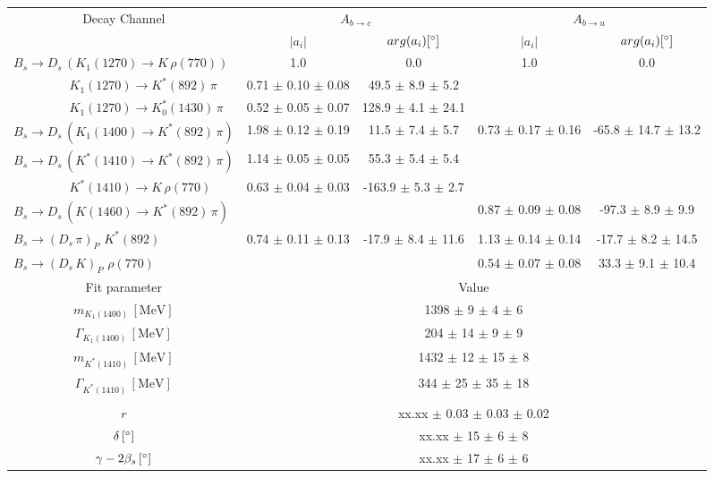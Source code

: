 \begin{tabular}{l c c c c } 
\hline
\hline
\multicolumn{1}{c}{Decay Channel} & \multicolumn{2}{c}{$A_{b \to c}$} & \multicolumn{2}{c}{$A_{b \to u}$}  \\ 
 & \multicolumn{1}{c}{$\vert a_i \vert$}  & \multicolumn{1}{c}{$arg(a_i) [^{\circ}]$}  & \multicolumn{1}{c}{$\vert a_i \vert$} & \multicolumn{1}{c}{$arg(a_i) [^{\circ}]$} \\ 
\hline
 $B_s \to D_s \, ( K_1(1270) \to K \, \rho(770) ) $ &  1.0 & 0.0 & 1.0 & 0.0  \\ 
$\phantom{B_s \to D_s \, (} K_1(1270) \to K^{*}(892) \, \pi \phantom{)} $ & 0.71 $\pm$ 0.10 $\pm$ 0.08 & 49.5 $\pm$ 8.9 $\pm$ 5.2 & &   \\ 
$\phantom{B_s \to D_s \, (} K_1(1270) \to K^{*}_{0}(1430) \, \pi \phantom{)} $ & 0.52 $\pm$ 0.05 $\pm$ 0.07 & 128.9 $\pm$ 4.1 $\pm$ 24.1 & &   \\ 
$B_s \to D_s \, ( K_1(1400) \to K^{*}(892) \, \pi ) $ & 1.98 $\pm$ 0.12 $\pm$ 0.19 & 11.5 $\pm$ 7.4 $\pm$ 5.7 & 0.73 $\pm$ 0.17 $\pm$ 0.16 & -65.8 $\pm$ 14.7 $\pm$ 13.2 \\ 
$B_s \to D_s \, ( K^{*}(1410) \to K^{*}(892) \, \pi ) $ & 1.14 $\pm$ 0.05 $\pm$ 0.05 & 55.3 $\pm$ 5.4 $\pm$ 5.4 &  &  \\ 
$\phantom{B_s \to D_s \, (} K^{*}(1410) \to K \, \rho(770) \phantom{)} $ & 0.63 $\pm$ 0.04 $\pm$ 0.03 & -163.9 $\pm$ 5.3 $\pm$ 2.7 & &   \\ 
$B_s \to D_s \, ( K(1460) \to K^{*}(892) \, \pi ) $ & & &0.87 $\pm$ 0.09 $\pm$ 0.08 & -97.3 $\pm$ 8.9 $\pm$ 9.9 \\ 
$B_s \to ( D_s \, \pi)_{P} \, \, K^{*}(892) $ & 0.74 $\pm$ 0.11 $\pm$ 0.13 & -17.9 $\pm$ 8.4 $\pm$ 11.6 & 1.13 $\pm$ 0.14 $\pm$ 0.14 & -17.7 $\pm$ 8.2 $\pm$ 14.5 \\ 
$B_s \to ( D_s \, K)_{P} \, \, \rho(770) $ & & &0.54 $\pm$ 0.07 $\pm$ 0.08 & 33.3 $\pm$ 9.1 $\pm$ 10.4 \\ 
\hline
\hline
\multicolumn{1}{c}{Fit parameter} & \multicolumn{4}{c}{Value}  \\ 
\hline
\multicolumn{1}{c}{$m_{K_1(1400)} \, [\text{MeV}]$} & \multicolumn{4}{c}{1398 $\pm$ 9 $\pm$ 4 $\pm$ 6} \\ 
\multicolumn{1}{c}{$\Gamma_{K_1(1400)} \, [\text{MeV}]$} & \multicolumn{4}{c}{204 $\pm$ 14 $\pm$ 9 $\pm$ 9} \\ 
\multicolumn{1}{c}{$m_{K^{*}(1410)} \, [\text{MeV}]$} & \multicolumn{4}{c}{1432 $\pm$ 12 $\pm$ 15 $\pm$ 8} \\ 
\multicolumn{1}{c}{$\Gamma_{K^{*}(1410)} \, [\text{MeV}]$} & \multicolumn{4}{c}{344 $\pm$ 25 $\pm$ 35 $\pm$ 18} \\ 
 \\ 
\multicolumn{1}{c}{$r$} & \multicolumn{4}{c}{xx.xx $\pm$ 0.03 $\pm$ 0.03 $\pm$ 0.02} \\ 
\multicolumn{1}{c}{$\delta \, [^{\circ}]$} & \multicolumn{4}{c}{xx.xx $\pm$ 15 $\pm$ 6 $\pm$ 8} \\ 
\multicolumn{1}{c}{$\gamma - 2 \beta_{s} \, [^{\circ}]$} & \multicolumn{4}{c}{xx.xx $\pm$ 17 $\pm$ 6 $\pm$ 6} \\ 
\hline
\hline
\end{tabular}
